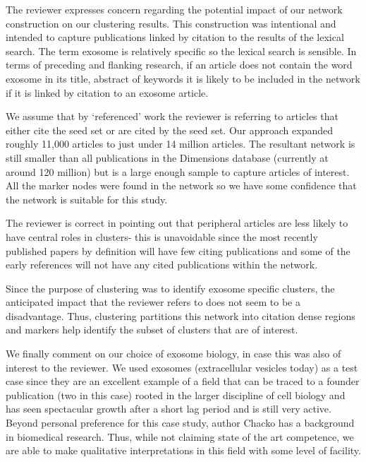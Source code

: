 \documentclass[11pt, oneside]{article}   	%
\begin{document}
The reviewer expresses concern regarding the potential impact of our network construction on our clustering results.  This construction was intentional and intended to capture publications linked by citation to the results of the lexical search. The term exosome is relatively specific so the lexical search is sensible. In terms of preceding and flanking research, if an article does not contain the word exosome in its title, abstract of keywords it is likely to be included in the network if it is linked by citation to an exosome article. 

We assume that by `referenced' work the reviewer is referring to articles that either cite the seed set or are cited by the seed set. Our approach expanded roughly 11,000 articles to just under 14 million articles. The resultant network is still smaller than all publications in the Dimensions database (currently at around 120 million) but is a large enough sample to capture articles of interest. All the marker nodes were found in the network so we have some confidence that the network is suitable for this study.  

The reviewer is correct in pointing out that peripheral articles are less likely to have central roles in clusters- this is unavoidable since the most recently published papers by definition will have few citing publications and some of the early references will not have any cited publications within the network. 



Since the purpose of clustering was to identify exosome specific clusters, the anticipated impact that the reviewer refers to does not seem to be a disadvantage. Thus, clustering partitions this network into citation dense regions and markers help identify the subset of clusters that are of interest. 

We finally comment on our choice of exosome biology, in case this was also of interest to the reviewer. We used exosomes (extracellular vesicles today) as a test case since they are an excellent example of a field that can be traced to a founder publication (two in this case) rooted in the larger discipline of cell biology and has seen spectacular growth after a short lag period and is still very active. Beyond personal preference for this case study, author Chacko has a background in biomedical research. Thus, while not claiming state of the art competence, we are able to make qualitative interpretations in this field with some level of facility.  
\end{document}
